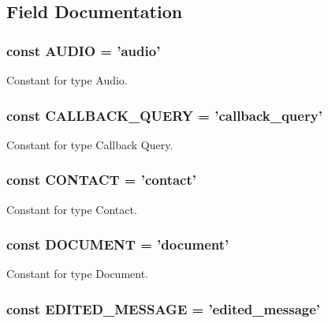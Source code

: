\subsection{Field Documentation}
\hypertarget{class_telegram_a9f6cfe013372d7de1568a95c871214d1}{
\subsubsection[{A\-U\-D\-I\-O}]{\setlength{\rightskip}{0pt plus 5cm}const A\-U\-D\-I\-O = 'audio'}}\label{class_telegram_a9f6cfe013372d7de1568a95c871214d1}
Constant for type Audio. \hypertarget{class_telegram_a464a4a095bb928388381b33e0babf9fe}{
\subsubsection[{C\-A\-L\-L\-B\-A\-C\-K\-\_\-\-Q\-U\-E\-R\-Y}]{\setlength{\rightskip}{0pt plus 5cm}const C\-A\-L\-L\-B\-A\-C\-K\-\_\-\-Q\-U\-E\-R\-Y = 'callback\-\_\-query'}}\label{class_telegram_a464a4a095bb928388381b33e0babf9fe}
Constant for type Callback Query. \hypertarget{class_telegram_aac7f4f1b55319f64ad56ae8a8222d9b5}{
\subsubsection[{C\-O\-N\-T\-A\-C\-T}]{\setlength{\rightskip}{0pt plus 5cm}const C\-O\-N\-T\-A\-C\-T = 'contact'}}\label{class_telegram_aac7f4f1b55319f64ad56ae8a8222d9b5}
Constant for type Contact. \hypertarget{class_telegram_a6494d627239bf203e03297843bf52053}{
\subsubsection[{D\-O\-C\-U\-M\-E\-N\-T}]{\setlength{\rightskip}{0pt plus 5cm}const D\-O\-C\-U\-M\-E\-N\-T = 'document'}}\label{class_telegram_a6494d627239bf203e03297843bf52053}
Constant for type Document. \hypertarget{class_telegram_aa469cc007db1409d59a5e5bfac0633ec}{
\subsubsection[{E\-D\-I\-T\-E\-D\-\_\-\-M\-E\-S\-S\-A\-G\-E}]{\setlength{\rightskip}{0pt plus 5cm}const E\-D\-I\-T\-E\-D\-\_\-\-M\-E\-S\-S\-A\-G\-E = 'edited\-\_\-message'}}\label{class_telegram_aa469cc007db1409d59a5e5bfac0633ec}
